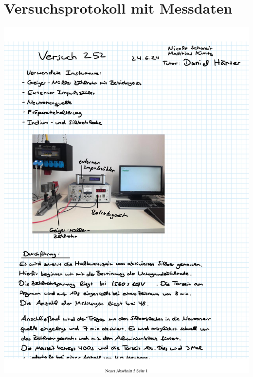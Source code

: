 \documentclass{article}
\begin{document}
\phantom{.}






\newpage

\section{Versuchsprotokoll mit Messdaten}

\includegraphics[width=\textwidth]{graphics/mess1.jpg}
\newpage
\end{document}
